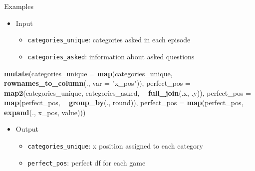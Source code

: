 \documentclass[
  ignorenonframetext,
]{beamer}
\newenvironment{Shaded}{\begin{snugshade}}{\end{snugshade}}
\newcommand{\DataTypeTok}[1]{\textcolor[rgb]{0.13,0.29,0.53}{#1}}
\newcommand{\KeywordTok}[1]{\textcolor[rgb]{0.13,0.29,0.53}{\textbf{#1}}}
\newcommand{\NormalTok}[1]{#1}
\newcommand{\OperatorTok}[1]{\textcolor[rgb]{0.81,0.36,0.00}{\textbf{#1}}}
\newcommand{\StringTok}[1]{\textcolor[rgb]{0.31,0.60,0.02}{#1}}
\providecommand{\tightlist}{%
  \setlength{\itemsep}{0pt}\setlength{\parskip}{0pt}}
\begin{document}
\begin{frame}[fragile]{Examples}
\protect\hypertarget{examples}{}

\begin{itemize}
\tightlist
\item
  Input

  \begin{itemize}
  \tightlist
  \item
    \texttt{categories\_unique}: categories asked in each episode
  \item
    \texttt{categories\_asked}: information about asked questions
  \end{itemize}
\end{itemize}

\begin{Shaded}
\begin{Highlighting}[]
\KeywordTok{mutate}\NormalTok{(}\DataTypeTok{categories_unique =} \KeywordTok{map}\NormalTok{(categories_unique, }
                            \OperatorTok{~}\StringTok{ }\KeywordTok{rownames_to_column}\NormalTok{(., }\DataTypeTok{var =} \StringTok{"x_pos"}\NormalTok{)),}
         \DataTypeTok{perfect_pos =} \KeywordTok{map2}\NormalTok{(categories_unique, categories_asked, }
                            \OperatorTok{~}\StringTok{ }\KeywordTok{full_join}\NormalTok{(.x, .y)),}
         \DataTypeTok{perfect_pos =} \KeywordTok{map}\NormalTok{(perfect_pos, }
                           \OperatorTok{~}\StringTok{ }\KeywordTok{group_by}\NormalTok{(., round)),}
         \DataTypeTok{perfect_pos =} \KeywordTok{map}\NormalTok{(perfect_pos, }
                           \OperatorTok{~}\StringTok{ }\KeywordTok{expand}\NormalTok{(., x_pos, value)))}
\end{Highlighting}
\end{Shaded}

\begin{itemize}
\tightlist
\item
  Output

  \begin{itemize}
  \tightlist
  \item
    \texttt{categories\_unique}: x position assigned to each category
  \item
    \texttt{perfect\_pos}: perfect df for each game
  \end{itemize}
\end{itemize}

\end{frame}
\end{document}
